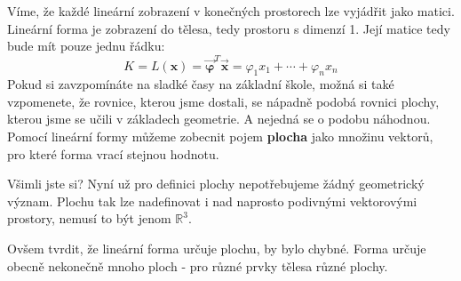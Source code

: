 \documentclass[a5paper,12pt]{amsbook}
\theoremstyle{definition}
\newcommand{\myscalar}[1]{#1}
\newcommand{\myvec}[1]{\bm{#1}}
\newcommand{\mycoord}[1]{\overrightarrow{\mathbf{#1}}}
\newcommand{\mymap}[1]{#1}
\begin{document}
Víme, že každé lineární zobrazení v konečných prostorech lze vyjádřit jako matici. Lineární forma
je zobrazení do tělesa, tedy prostoru s dimenzí 1. Její matice tedy bude mít pouze jednu řádku:
\begin{equation*}
\myscalar{K}=\mymap{L}(\myvec{x}) = \mycoord{\varphi}^T\mycoord{x} = \myscalar{\varphi_1}\myscalar{x_1} + \cdots + \myscalar{\varphi_n}\myscalar{x_n}
\end{equation*}
Pokud si zavzpomínáte na sladké časy na základní škole, možná si také vzpomenete, že rovnice, kterou
jsme dostali, se nápadně podobá rovnici plochy, kterou jsme se učili v základech geometrie. A nejedná
se o podobu náhodnou. Pomocí lineární formy můžeme zobecnit pojem \textbf{plocha} jako množinu vektorů,
pro které forma vrací stejnou hodnotu.

Všimli jste si? Nyní už pro definici plochy nepotřebujeme žádný geometrický význam. Plochu tak
lze nadefinovat i nad naprosto podivnými vektorovými prostory, nemusí to být jenom $\mathbb{R}^3$.

Ovšem tvrdit, že lineární forma určuje plochu, by bylo chybné. Forma určuje obecně nekonečně mnoho
ploch - pro různé prvky tělesa různé plochy.
\end{document}
